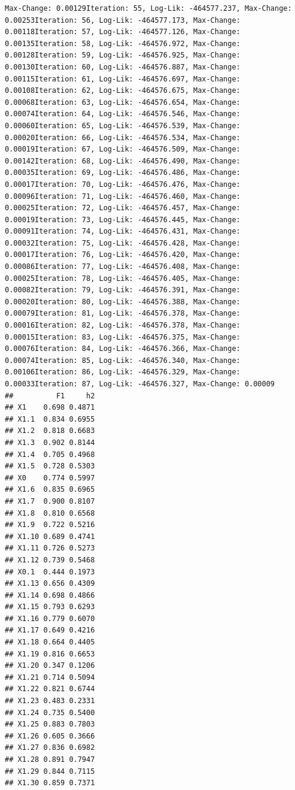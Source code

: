 \documentclass[
  jou]{apa6}
\begin{document}
\begin{verbatim}
Max-Change: 0.00129Iteration: 55, Log-Lik: -464577.237, Max-Change: 0.00253Iteration: 56, Log-Lik: -464577.173, Max-Change: 0.00118Iteration: 57, Log-Lik: -464577.126, Max-Change: 0.00135Iteration: 58, Log-Lik: -464576.972, Max-Change: 0.00128Iteration: 59, Log-Lik: -464576.925, Max-Change: 0.00130Iteration: 60, Log-Lik: -464576.887, Max-Change: 0.00115Iteration: 61, Log-Lik: -464576.697, Max-Change: 0.00108Iteration: 62, Log-Lik: -464576.675, Max-Change: 0.00068Iteration: 63, Log-Lik: -464576.654, Max-Change: 0.00074Iteration: 64, Log-Lik: -464576.546, Max-Change: 0.00060Iteration: 65, Log-Lik: -464576.539, Max-Change: 0.00020Iteration: 66, Log-Lik: -464576.534, Max-Change: 0.00019Iteration: 67, Log-Lik: -464576.509, Max-Change: 0.00142Iteration: 68, Log-Lik: -464576.490, Max-Change: 0.00035Iteration: 69, Log-Lik: -464576.486, Max-Change: 0.00017Iteration: 70, Log-Lik: -464576.476, Max-Change: 0.00096Iteration: 71, Log-Lik: -464576.460, Max-Change: 0.00025Iteration: 72, Log-Lik: -464576.457, Max-Change: 0.00019Iteration: 73, Log-Lik: -464576.445, Max-Change: 0.00091Iteration: 74, Log-Lik: -464576.431, Max-Change: 0.00032Iteration: 75, Log-Lik: -464576.428, Max-Change: 0.00017Iteration: 76, Log-Lik: -464576.420, Max-Change: 0.00086Iteration: 77, Log-Lik: -464576.408, Max-Change: 0.00025Iteration: 78, Log-Lik: -464576.405, Max-Change: 0.00082Iteration: 79, Log-Lik: -464576.391, Max-Change: 0.00020Iteration: 80, Log-Lik: -464576.388, Max-Change: 0.00079Iteration: 81, Log-Lik: -464576.378, Max-Change: 0.00016Iteration: 82, Log-Lik: -464576.378, Max-Change: 0.00015Iteration: 83, Log-Lik: -464576.375, Max-Change: 0.00076Iteration: 84, Log-Lik: -464576.366, Max-Change: 0.00074Iteration: 85, Log-Lik: -464576.340, Max-Change: 0.00106Iteration: 86, Log-Lik: -464576.329, Max-Change: 0.00033Iteration: 87, Log-Lik: -464576.327, Max-Change: 0.00009
##          F1     h2
## X1    0.698 0.4871
## X1.1  0.834 0.6955
## X1.2  0.818 0.6683
## X1.3  0.902 0.8144
## X1.4  0.705 0.4968
## X1.5  0.728 0.5303
## X0    0.774 0.5997
## X1.6  0.835 0.6965
## X1.7  0.900 0.8107
## X1.8  0.810 0.6568
## X1.9  0.722 0.5216
## X1.10 0.689 0.4741
## X1.11 0.726 0.5273
## X1.12 0.739 0.5468
## X0.1  0.444 0.1973
## X1.13 0.656 0.4309
## X1.14 0.698 0.4866
## X1.15 0.793 0.6293
## X1.16 0.779 0.6070
## X1.17 0.649 0.4216
## X1.18 0.664 0.4405
## X1.19 0.816 0.6653
## X1.20 0.347 0.1206
## X1.21 0.714 0.5094
## X1.22 0.821 0.6744
## X1.23 0.483 0.2331
## X1.24 0.735 0.5400
## X1.25 0.883 0.7803
## X1.26 0.605 0.3666
## X1.27 0.836 0.6982
## X1.28 0.891 0.7947
## X1.29 0.844 0.7115
## X1.30 0.859 0.7371

\end{verbatim}
\end{document}
